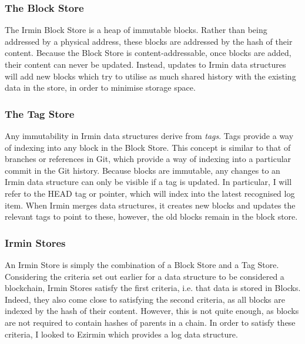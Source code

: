 \documentclass[12pt,a4paper,twoside,openright]{report}
\begin{document}
	\subsubsection*{The Block Store}
	The Irmin Block Store is a heap of immutable blocks. 
	Rather than being addressed by a physical address, these blocks are addressed by the hash of their content.
	Because the Block Store is content-addressable, once blocks are added, their content can never be updated.
	Instead, updates to Irmin data structures will add new blocks which try to utilise as much shared history with the existing data in the store, in order to minimise storage space.
	\subsubsection*{The Tag Store}
	Any immutability in Irmin data structures derive from \textit{tags}.
	Tags provide a way of indexing into any block in the Block Store.
	This concept is similar to that of branches or references in Git, which provide a way of indexing into a particular commit in the Git history.
	Because blocks are immutable, any changes to an Irmin data structure can only be visible if a tag is updated. 
	In particular, I will refer to the HEAD tag or pointer, which will index into the latest recognised log item.
	When Irmin merges data structures, it creates new blocks and updates the relevant tags to point to these, however, the old blocks remain in the block store.
	\subsubsection*{Irmin Stores}
	An Irmin Store is simply the combination of a Block Store and a Tag Store.
	Considering the criteria set out earlier for a data structure to be considered a blockchain, Irmin Stores satisfy the first criteria, i.e. that data is stored in Blocks.
	Indeed, they also come close to satisfying the second criteria, as all blocks are indexed by the hash of their content. 
	However, this is not quite enough, as blocks are not required to contain hashes of parents in a chain.
	In order to satisfy these criteria, I looked to Ezirmin which provides a log data structure.
\end{document}
